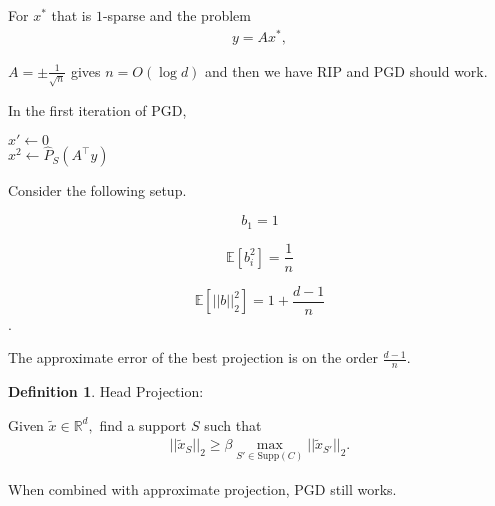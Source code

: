 \documentclass{article}
\theoremstyle{definition}
\newtheorem{definition}{Definition}
\begin{document}
For $x^*$ that is $1$-sparse and the problem
\begin{align*}
y = Ax^*,
\end{align*}

$A = \pm \frac{1}{\sqrt{n}}$ gives $n= O(\log d)$ and then we have RIP and PGD should work. 

In the first iteration of PGD, 
\begin{center}
$x' \leftarrow 0$ \\
$x^2 \leftarrow \hat{P}_S(A^{\top} y)$
\end{center}


Consider the following setup. 

$$b_1 = 1$$

$$\mathbb{E}[b_i^2] = \frac{1}{n}$$

$$\mathbb{E}[ ||b||_2^2] = 1 + \frac{d-1}{n}$$.


The approximate error of the best projection is on the order $\frac{d-1}{n}$.

\begin{definition}
Head Projection:

Given $\tilde{x} \in \mathbb{R}^d,$ find a support $S$ such that
\begin{align}
||\tilde{x}_S||_2 \geq \beta \max_{S' \in \text{Supp}(C)} ||\tilde{x}_{S'}||_2.
\end{align}
\end{definition}

When combined with approximate projection, PGD still works.
\end{document}
